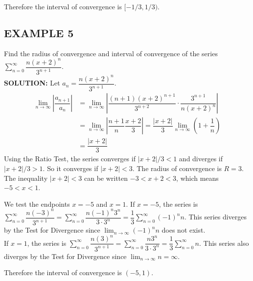 \documentclass{article}
\theoremstyle{mystyle}
\begin{document}
Therefore the interval of convergence is \([-1/3, 1/3)\).

\subsection*{EXAMPLE 5}
Find the radius of convergence and interval of convergence of the series \( \sum_{n=0}^{\infty} \dfrac{n(x+2)^n}{3^{n+1}} \).\\
\textbf{SOLUTION:}
Let \(a_n = \dfrac{n(x+2)^n}{3^{n+1}}\).
\begin{align*}
    \lim_{n\to\infty} \left| \dfrac{a_{n+1}}{a_n} \right| &= \lim_{n\to\infty} \left| \dfrac{(n+1)(x+2)^{n+1}}{3^{n+2}} \cdot \dfrac{3^{n+1}}{n(x+2)^n} \right| \\
    &= \lim_{n\to\infty} \left| \dfrac{n+1}{n} \dfrac{x+2}{3} \right| = \dfrac{|x+2|}{3} \lim_{n\to\infty} \left(1+\dfrac{1}{n}\right) \\
    &= \dfrac{|x+2|}{3}
\end{align*}
Using the Ratio Test, the series converges if \(|x+2|/3 < 1\) and diverges if \(|x+2|/3 > 1\). So it converges if \(|x+2| < 3\).
The radius of convergence is \(R=3\).
The inequality \(|x+2|<3\) can be written \(-3 < x+2 < 3\), which means \(-5 < x < 1\).

We test the endpoints \(x=-5\) and \(x=1\).
If \(x=-5\), the series is \( \sum_{n=0}^\infty \dfrac{n(-3)^n}{3^{n+1}} = \sum_{n=0}^\infty \dfrac{n(-1)^n 3^n}{3 \cdot 3^n} = \dfrac{1}{3} \sum_{n=0}^\infty (-1)^n n \). This series diverges by the Test for Divergence since \( \lim_{n\to\infty} (-1)^n n \) does not exist.\\
If \(x=1\), the series is \( \sum_{n=0}^\infty \dfrac{n(3)^n}{3^{n+1}} = \sum_{n=0}^\infty \dfrac{n 3^n}{3 \cdot 3^n} = \dfrac{1}{3} \sum_{n=0}^\infty n \). This series also diverges by the Test for Divergence since \( \lim_{n\to\infty} n = \infty \).

Therefore the interval of convergence is \((-5, 1)\).
\end{document}
